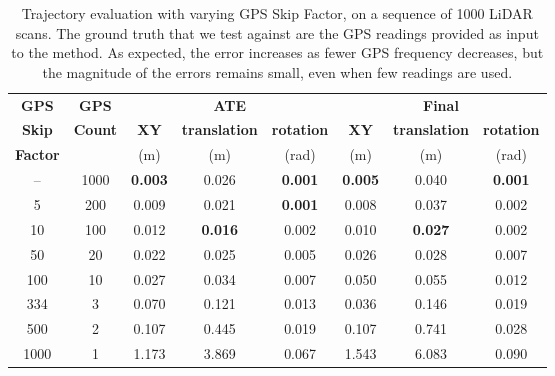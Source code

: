\begin{table}[h]
    \centering
    {\small
        \begin{tabular}{cc|ccc|ccc}
            \hline
            \textbf{GPS}    & \textbf{GPS}   & \multicolumn{3}{c|}{\textbf{ATE}} & \multicolumn{3}{c}{\textbf{Final}}                                                                                 \\
            \textbf{Skip}   & \textbf{Count} & \textbf{XY}                       & \textbf{translation}               & \textbf{rotation} & \textbf{XY}    & \textbf{translation} & \textbf{rotation} \\
            \textbf{Factor} &                & (m)                               & (m)                                & (rad)             & (m)            & (m)                  & (rad)             \\
            \hline
            \hline
            --              & 1000           & \textbf{0.003}                    & 0.026                              & \textbf{0.001}    & \textbf{0.005} & 0.040                & \textbf{0.001}    \\
            5               & 200            & 0.009                             & 0.021                              & \textbf{0.001}    & 0.008          & 0.037                & 0.002             \\
            10              & 100            & 0.012                             & \textbf{0.016}                     & 0.002             & 0.010          & \textbf{0.027}       & 0.002             \\
            50              & 20             & 0.022                             & 0.025                              & 0.005             & 0.026          & 0.028                & 0.007             \\
            100             & 10             & 0.027                             & 0.034                              & 0.007             & 0.050          & 0.055                & 0.012             \\
            334             & 3              & 0.070                             & 0.121                              & 0.013             & 0.036          & 0.146                & 0.019             \\
            500             & 2              & 0.107                             & 0.445                              & 0.019             & 0.107          & 0.741                & 0.028             \\
            1000            & 1              & 1.173                             & 3.869                              & 0.067             & 1.543          & 6.083                & 0.090             \\
            \hline
        \end{tabular}
    }
    \caption{Trajectory evaluation with varying GPS Skip Factor, on a sequence of 1000 LiDAR scans. The ground truth that we test against are the GPS readings provided as input to the method. As expected, the error increases as fewer GPS frequency decreases, but the magnitude of the errors remains small, even when few readings are used.}
    \label{tab:gps-skip}
\end{table}
\clearpage
